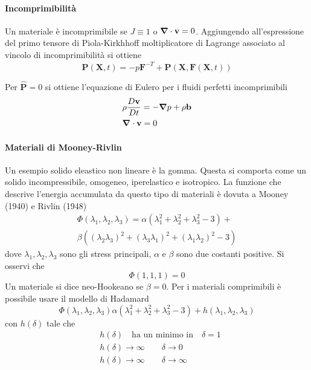 \paragraph{Incomprimibilità}
Un materiale è incomprimibile se $J\equiv 1$ o $\boldsymbol{\nabla}\cdot\mathbf{v}=0$.
Aggiungendo all'espressione del primo tensore di Piola-Kirkhhoff moltiplicatore di Lagrange associato al vincolo di incomprimibilità si ottiene
\begin{equation*}
\mathbf{P}(\mathbf{X},t)=-p\mathbf{F}^{-T}+\widehat{\mathbf{P}}(\mathbf{X},\mathbf{F}(\mathbf{X},t))
\end{equation*}

Per $\widehat{\mathbf{P}}=0$  si ottiene l'equazione di Eulero per i fluidi perfetti incomprimibili
\begin{align*}
&\rho\frac{D \mathbf{v}}{Dt} = -\boldsymbol{\nabla} p+\rho\mathbf{b} \\
&\boldsymbol{\nabla}\cdot\mathbf{v}=0
\end{align*}

\paragraph{Materiali di Mooney-Rivlin}
Un esempio solido eleastico non lineare è la gomma. Questa si comporta come un solido incompressibile, omogeneo, iperelastico e isotropico.
La funzione che descrive l'energia accumulata da questo tipo di materiali è dovuta a Mooney (1940) e Rivlin (1948)
\begin{multline*}
\Phi(\lambda_1,\lambda_2,\lambda_3) = \alpha(\lambda_1^2+\lambda_2^2+\lambda_3^2-3) + \\ \beta((\lambda_2\lambda_3)^2+(\lambda_3\lambda_1)^2+(\lambda_1\lambda_2)^2 -3)
\end{multline*}
dove $\lambda_1,\lambda_2,\lambda_3$ sono gli stress principali, $\alpha$ e $\beta$ sono due costanti positive. 
Si osservi che 
\begin{equation*}
\Phi(1,1,1) = 0
\end{equation*}
Un materiale si dice neo-Hookeano se $\beta=0$.
Per i materiali comprimibili è possibile usare il modello di Hadamard
\begin{equation*}
\Phi(\lambda_1,\lambda_2,\lambda_3)\alpha(\lambda_1^2+\lambda_2^2+\lambda_3^2-3) + h(\lambda_1,\lambda_2,\lambda_3)
\end{equation*}
con $h(\delta)$ tale che
\begin{align*}
&h(\delta) \quad\text{ha un minimo in}\quad\delta=1 \\
&h(\delta)\to\infty\qquad\delta\to 0\\
&h(\delta)\to\infty\qquad\delta\to\infty\\
\end{align*}

